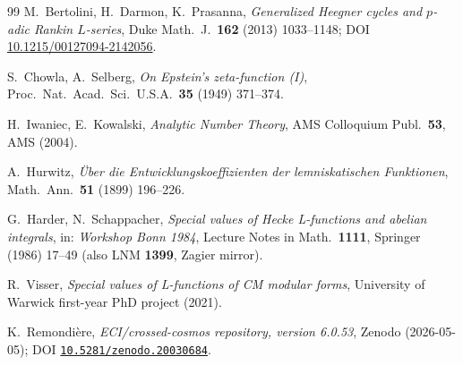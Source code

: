 \documentclass[a4paper,11pt]{article}
\newcommand{\Zeno}{\href{https://doi.org/10.5281/zenodo.20030684}{\texttt{10.5281/zenodo.20030684}}}
\theoremstyle{definition}
\theoremstyle{remark}
\begin{document}
\begin{thebibliography}{99}
M.~Bertolini, H.~Darmon, K.~Prasanna,
\emph{Generalized Heegner cycles and $p$-adic Rankin $L$-series},
Duke Math.\ J.\ \textbf{162} (2013) 1033--1148;
DOI \href{https://doi.org/10.1215/00127094-2142056}{10.1215/00127094-2142056}.

S.~Chowla, A.~Selberg,
\emph{On Epstein's zeta-function (I)},
Proc.~Nat.~Acad.~Sci.~U.S.A.\ \textbf{35} (1949) 371--374.

H.~Iwaniec, E.~Kowalski,
\emph{Analytic Number Theory},
AMS Colloquium Publ.\ \textbf{53}, AMS (2004).

A.~Hurwitz,
\emph{\"Uber die Entwicklungskoeffizienten der lemniskatischen
Funktionen},
Math.~Ann.\ \textbf{51} (1899) 196--226.

G.~Harder, N.~Schappacher,
\emph{Special values of Hecke L-functions and abelian integrals},
in: \emph{Workshop Bonn 1984}, Lecture Notes in Math.\ \textbf{1111},
Springer (1986) 17--49 (also LNM \textbf{1399}, Zagier mirror).

R.~Visser,
\emph{Special values of L-functions of CM modular forms},
University of Warwick first-year PhD project (2021).

K.~Remondi\`ere,
\emph{ECI/crossed-cosmos repository, version 6.0.53},
Zenodo (2026-05-05);
DOI \Zeno.

\end{thebibliography}
\end{document}
